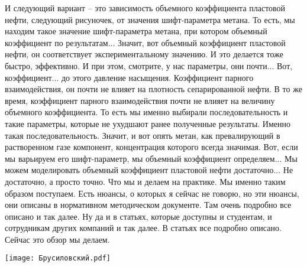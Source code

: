 \documentclass[main.tex]{subfiles}
\begin{document}
И следующий вариант -- это зависимость объемного коэффициента пластовой нефти, следующий рисуночек, от значения шифт-параметра метана.
То есть, мы находим такое значение шифт-параметра метана, при котором объемный коэффициент по результатам...
Значит, вот объемный коэффициент пластовой нефти, он соответствует экспериментальному значению.
И это делается тоже быстро, эффективно.
И при этом, смотрите, у нас параметры, они почти...
Вот, коэффициент... до этого давление насыщения.
Коэффициент парного взаимодействия, он почти не влияет на плотность сепарированной нефти.
В то же время, коэффициент парного взаимодействия почти не влияет на величину объемного коэффициента.
То есть мы именно выбирали последовательность и такие параметры, которые не ухудшают ранее полученные результаты.
Именно такая последовательность.
Значит, и вот опять метан, как превалирующий в растворенном газе компонент, концентрация которого всегда значимая.
Вот, если мы варьируем его шифт-параметр, мы объемный коэффициент определяем...
Мы можем моделировать объемный коэффициент пластовой нефти достаточно...
Не достаточно, а просто точно.
Что мы и делаем на практике.
Мы именно таким образом поступаем.
Есть нюансы, о которых я сейчас не говорю, но эти нюансы, они описаны в нормативном методическом документе.
Там очень подробно все описано и так далее.
Ну да и в статьях, которые доступны и студентам, и сотрудникам других компаний и так далее.
В статьях все подробно описано.
Сейчас это обзор мы делаем.

\begin{center}
\texttt{[image: Брусиловский.pdf]}
\end{center}
\end{document}
